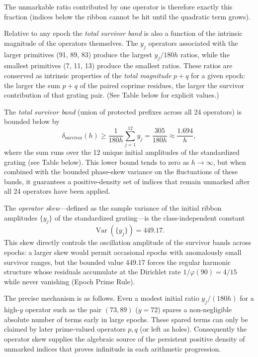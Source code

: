 \documentclass[11pt,a4paper]{article}
\begin{document}
The unmarkable ratio contributed by one operator is therefore exactly this fraction (indices below the ribbon cannot be hit until the quadratic term grows).

Relative to any epoch the \emph{total survivor band} is also a function of the intrinsic magnitude of the operators themselves. The \(y_j\) operators associated with the larger primitives (91, 89, 83) produce the largest \(y_j/180h\) ratios, while the smallest primitives (7, 11, 13) produce the smallest ratios. These ratios are conserved as intrinsic properties of the \emph{total magnitude} \(p+q\) for a given epoch: the larger the sum \(p+q\) of the paired coprime residues, the larger the survivor contribution of that grating pair. (See Table below for explicit values.)

The \emph{total survivor band} (union of protected prefixes across all 24 operators) is bounded below by
\[
\delta_{\text{survivor}}(h) \ge \frac{1}{180h} \sum_{j=1}^{12} y_j = \frac{305}{180h} \approx \frac{1.694}{h},
\]
where the sum runs over the 12 unique initial amplitudes of the standardized grating (see Table below). This lower bound tends to zero as \(h\to\infty\), but when combined with the bounded phase-skew variance on the fluctuations of these bands, it guarantees a positive-density set of indices that remain unmarked after all 24 operators have been applied.

The \emph{operator skew}—defined as the sample variance of the initial ribbon amplitudes \(\{y_j\}\) of the standardized grating—is the class-independent constant
\[
\operatorname{Var}(\{y_j\}) = 449.17.
\]
This skew directly controls the oscillation amplitude of the survivor bands across epochs: a larger skew would permit occasional epochs with anomalously small survivor ranges, but the bounded value 449.17 forces the regular harmonic structure whose residuals accumulate at the Dirichlet rate \(1/\varphi(90)=4/15\) while never vanishing (Epoch Prime Rule).

The precise mechanism is as follows. Even a modest initial ratio \(y_j/(180h)\) for a high-\(y\) operator such as the pair \((73,89)\) (\(y=72\)) spares a non-negligible absolute number of terms early in large epochs. These spared terms can only be claimed by later prime-valued operators \(p,q\) (or left as holes). Consequently the operator skew supplies the algebraic source of the persistent positive density of unmarked indices that proves infinitude in each arithmetic progression.
\end{document}
